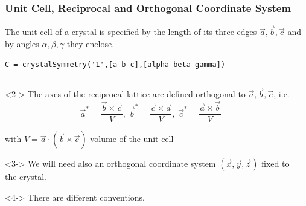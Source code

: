 \documentclass[compress]{beamer}
\begin{document}
\begin{frame}[fragile]
  \frametitle{Unit Cell, Reciprocal and Orthogonal Coordinate System}

  \begin{overlayarea}{\textwidth}{8cm}
    The unit cell of a crystal is specified by the length of its three edges
    $\vec a, \vec b, \vec c$ and by angles $\alpha, \beta, \gamma$ they enclose.

  \begin{lstlisting}[style=input]
C = crystalSymmetry('1',[a b c],[alpha beta gamma])
  \end{lstlisting}

  \begin{columns}
    \begin{column}{7.5cm}

      \begin{uncoverenv}<2->
        The axes of the reciprocal lattice are defined
        orthogonal to $\vec a, \vec b, \vec c$, i.e.
\vspace{-0.2cm}
\begin{equation*}
  \vec a^{*} = \frac{\vec b \times \vec c}{V}, \;
  \vec b^{*} = \frac{\vec c \times \vec a}{V}, \;
  \vec c^{*} = \frac{\vec a \times \vec b}{V}
\end{equation*}

\vspace{-0.4cm}

with  $V = \vec a \cdot (\vec b \times \vec c)$  volume of the unit cell
      \end{uncoverenv}

      \medskip

      \begin{uncoverenv}<3->
        We will need also an orthogonal coordinate system $(\vec x, \vec y,
        \vec z)$ fixed to the crystal.
      \end{uncoverenv}

      \medskip

      \begin{uncoverenv}<4->
        \alert{There are different conventions.}
      \end{uncoverenv}

  \end{column}

    \begin{column}{4.5cm}
      \begin{tikzpicture}[x  = {(-0.5cm,-0.5cm)},
        y  = {(0.9659cm,-0.25882cm)},
        z  = {(0cm,1cm)},
        scale = 2]


\end{tikzpicture}
\end{column}
\end{columns}
\end{overlayarea}
\end{frame}
\end{document}
